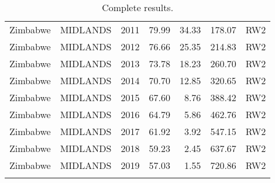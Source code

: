\begin{longtable}{lllrrrl}
  Zimbabwe & MIDLANDS & 2011 & 79.99 & 34.33 & 178.07 & RW2 \\ 
  Zimbabwe & MIDLANDS & 2012 & 76.66 & 25.35 & 214.83 & RW2 \\ 
  Zimbabwe & MIDLANDS & 2013 & 73.78 & 18.23 & 260.70 & RW2 \\ 
  Zimbabwe & MIDLANDS & 2014 & 70.70 & 12.85 & 320.65 & RW2 \\ 
  Zimbabwe & MIDLANDS & 2015 & 67.60 & 8.76 & 388.42 & RW2 \\ 
  Zimbabwe & MIDLANDS & 2016 & 64.79 & 5.86 & 462.76 & RW2 \\ 
  Zimbabwe & MIDLANDS & 2017 & 61.92 & 3.92 & 547.15 & RW2 \\ 
  Zimbabwe & MIDLANDS & 2018 & 59.23 & 2.45 & 637.67 & RW2 \\ 
  Zimbabwe & MIDLANDS & 2019 & 57.03 & 1.55 & 720.86 & RW2 \\ 
  \hline
\caption{Complete results.} 
\label{fulltable}
\end{longtable}
